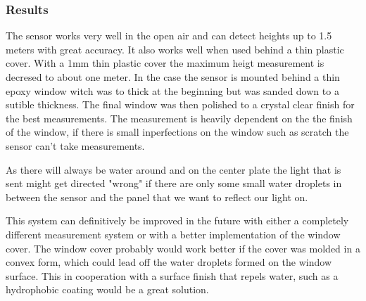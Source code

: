 \subsubsection{Results}

The sensor works very well in the open air and can detect heights up to 1.5 meters with great accuracy. It also works well when used behind a thin plastic cover. With a 1mm thin plastic cover the maximum heigt measurement is decresed to about one meter. In the case the sensor is mounted behind a thin epoxy window witch was to thick at the beginning but was sanded down to a sutible thickness. The final window was then polished to a crystal clear finish for the best measurements. The measurement is heavily dependent on the the finish of the window, if there is small inperfections on the window such as scratch the sensor can't take measurements.

As there will always be water around and on the center plate the light that is sent might get directed "wrong" if there are only some small water droplets in between the sensor and the panel that we want to reflect our light on.  

This system can definitively be improved in the future with either a completely different measurement system or with a better implementation of the window cover. The window cover probably would work better if the cover was molded in a convex form, which could lead off the water droplets formed on the window surface. This in cooperation with a surface finish that repels water, such as a hydrophobic coating would be a great solution. 



